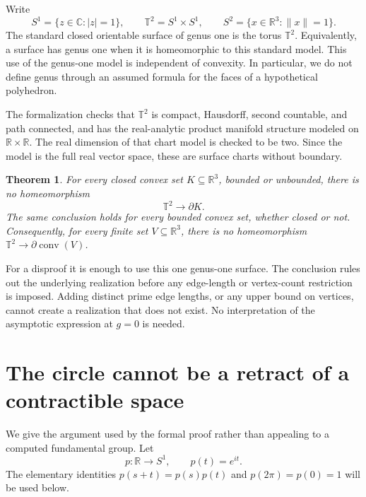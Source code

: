 \documentclass[11pt]{article}
\newtheorem{theorem}{Theorem}
\newcommand{\R}{\mathbb R}
\newcommand{\C}{\mathbb C}
\newcommand{\T}{\mathbb T}
\newcommand{\bd}{\partial}
\newcommand{\conv}{\operatorname{conv}}
\begin{document}
Write
\[
 S^1=\{z\in\C:|z|=1\},\qquad
 \T^2=S^1\times S^1,\qquad
 S^2=\{x\in\R^3:\|x\|=1\}.
\]
The standard closed orientable surface of genus one is the torus $\T^2$. Equivalently, a surface has genus one when it is homeomorphic to this standard model. This use of the genus-one model is independent of convexity. In particular, we do not define genus through an assumed formula for the faces of a hypothetical polyhedron.

The formalization checks that $\T^2$ is compact, Hausdorff, second countable, and path connected, and has the real-analytic product manifold structure modeled on $\R\times\R$. The real dimension of that chart model is checked to be two. Since the model is the full real vector space, these are surface charts without boundary.

\begin{theorem}\label{thm:main}
For every closed convex set $K\subseteq\R^3$, bounded or unbounded, there is no homeomorphism
\[
\T^2\longrightarrow\bd K.
\]
The same conclusion holds for every bounded convex set, whether closed or not. Consequently, for every finite set $V\subseteq\R^3$, there is no homeomorphism $\T^2\longrightarrow\bd\conv(V)$.
\end{theorem}

For a disproof it is enough to use this one genus-one surface. The conclusion rules out the underlying realization before any edge-length or vertex-count restriction is imposed. Adding distinct prime edge lengths, or any upper bound on vertices, cannot create a realization that does not exist. No interpretation of the asymptotic expression at $g=0$ is needed.

\section{The circle cannot be a retract of a contractible space}
We give the argument used by the formal proof rather than appealing to a computed fundamental group. Let
\[
p:\R\longrightarrow S^1,\qquad p(t)=e^{it}.
\]
The elementary identities $p(s+t)=p(s)p(t)$ and $p(2\pi)=p(0)=1$ will be used below.
\end{document}
